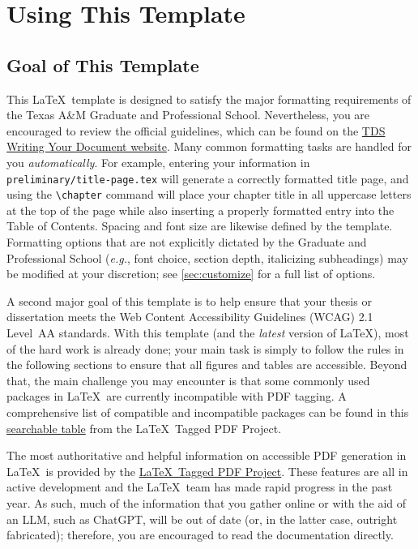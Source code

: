 \chapter{Using This Template}\label{ch:usage}
\section{Goal of This Template}
This \LaTeX\ template is designed to satisfy the major formatting requirements of the Texas A\&M Graduate and Professional School.
Nevertheless, you are encouraged to review the official guidelines, which can be found on the
\href{https://grad.tamu.edu/degree-completion/thesis-and-dissertation/writing-tools/index.html}{TDS Writing Your Document website}.
Many common formatting tasks are handled for you \textit{automatically}.
For example, entering your information in \texttt{preliminary/title-page.tex} will generate a correctly formatted title page, and using the \texttt{\backslash chapter} command will place your chapter title in all uppercase letters at the top of the page while also inserting a properly formatted entry into the Table of Contents.
Spacing and font size are likewise defined by the template.
Formatting options that are not explicitly dictated by the Graduate and Professional School (\textit{e.g.}, font choice, section depth, italicizing subheadings) may be modified at your discretion; see \autoref{sec:customize} for a full list of options.

A second major goal of this template is to help ensure that your thesis or dissertation meets the Web Content Accessibility Guidelines (WCAG) 2.1 Level~AA standards.
With this template (and the \textit{latest} version of \LaTeX), most of the hard work is already done; your main task is simply to follow the rules in the following sections to ensure that all figures and tables are accessible.
Beyond that, the main challenge you may encounter is that some commonly used packages in \LaTeX\ are currently incompatible with PDF tagging.
A comprehensive list of compatible and incompatible packages can be found in this
\href{https://latex3.github.io/tagging-project/tagging-status/}{searchable table} from the \LaTeX\ Tagged PDF Project.

The most authoritative and helpful information on accessible PDF generation in \LaTeX\ is provided by the
\href{https://latex3.github.io/tagging-project/}{\LaTeX\ Tagged PDF Project}.
These features are all in active development and the \LaTeX\ team has made rapid progress in the past year.
As such, much of the information that you gather online or with the aid of an LLM, such as ChatGPT, will be out of date (or, in the latter case, outright fabricated); therefore, you are encouraged to read the documentation directly.

